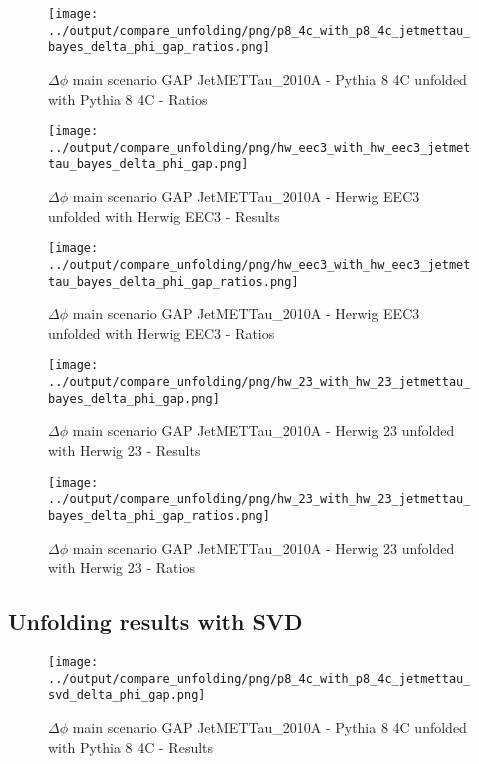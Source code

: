 \documentclass[11pt]{book}
\begin{document}
\begin{figure}[ht]
\centering
\texttt{[image: ../output/compare\_unfolding/png/p8\_4c\_with\_p8\_4c\_jetmettau\_bayes\_delta\_phi\_gap\_ratios.png]}
\caption{$\Delta\phi$ main scenario GAP JetMETTau\_2010A - Pythia 8 4C unfolded with Pythia 8 4C - Ratios}
\label{p8_p8_jetmettau_bayes_delta_phi_gap_b}
\end{figure}

\begin{figure}[ht]
\centering
\texttt{[image: ../output/compare\_unfolding/png/hw\_eec3\_with\_hw\_eec3\_jetmettau\_bayes\_delta\_phi\_gap.png]}
\caption{$\Delta\phi$ main scenario GAP JetMETTau\_2010A - Herwig EEC3 unfolded with Herwig EEC3 - Results}
\label{hw_eec3_hw_eec3_jetmettau_bayes_delta_phi_gap_a}
\end{figure}

\begin{figure}[ht]
\centering
\texttt{[image: ../output/compare\_unfolding/png/hw\_eec3\_with\_hw\_eec3\_jetmettau\_bayes\_delta\_phi\_gap\_ratios.png]}
\caption{$\Delta\phi$ main scenario GAP JetMETTau\_2010A - Herwig EEC3 unfolded with Herwig EEC3 - Ratios}
\label{hw_eec3_hw_eec3_jetmettau_bayes_delta_phi_gap_b}
\end{figure}

\begin{figure}[ht]
\centering
\texttt{[image: ../output/compare\_unfolding/png/hw\_23\_with\_hw\_23\_jetmettau\_bayes\_delta\_phi\_gap.png]}
\caption{$\Delta\phi$ main scenario GAP JetMETTau\_2010A - Herwig 23 unfolded with Herwig 23 - Results}
\label{hw_23_hw_23_jetmettau_bayes_delta_phi_gap_a}
\end{figure}

\begin{figure}[ht]
\centering
\texttt{[image: ../output/compare\_unfolding/png/hw\_23\_with\_hw\_23\_jetmettau\_bayes\_delta\_phi\_gap\_ratios.png]}
\caption{$\Delta\phi$ main scenario GAP JetMETTau\_2010A - Herwig 23 unfolded with Herwig 23 - Ratios}
\label{hw_23_hw_23_jetmettau_bayes_delta_phi_gap_b}
\end{figure}


\clearpage
\subsection{Unfolding results with SVD}

\begin{figure}[ht]
\centering
\texttt{[image: ../output/compare\_unfolding/png/p8\_4c\_with\_p8\_4c\_jetmettau\_svd\_delta\_phi\_gap.png]}
\caption{$\Delta\phi$ main scenario GAP JetMETTau\_2010A - Pythia 8 4C unfolded with Pythia 8 4C - Results}
\label{p8_p8_jetmettau_svd_delta_phi_gap_a}
\end{figure}
\end{document}
